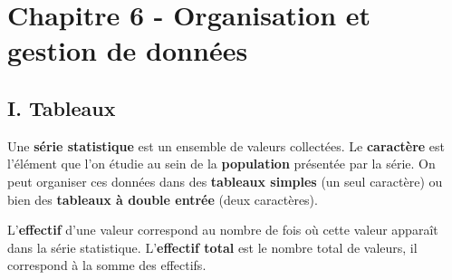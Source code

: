 
\section*{Chapitre 6 - Organisation et gestion de données}

\subsection*{I. Tableaux}

\begin{Définition}[c]
Une \textbf{série statistique} est un ensemble de valeurs collectées. Le \textbf{caractère} est l'élément que l'on étudie au sein de la \textbf{population} présentée par la série. On peut organiser ces données dans des \textbf{tableaux simples} (un seul caractère) ou bien des \textbf{tableaux à double entrée} (deux caractères).
\end{Définition}

\begin{Définition}[c]
L'\textbf{effectif} d'une valeur correspond au nombre de fois où cette valeur apparaît dans la série statistique. L'\textbf{effectif total} est le nombre total de valeurs, il correspond à la somme des effectifs.
\end{Définition}


